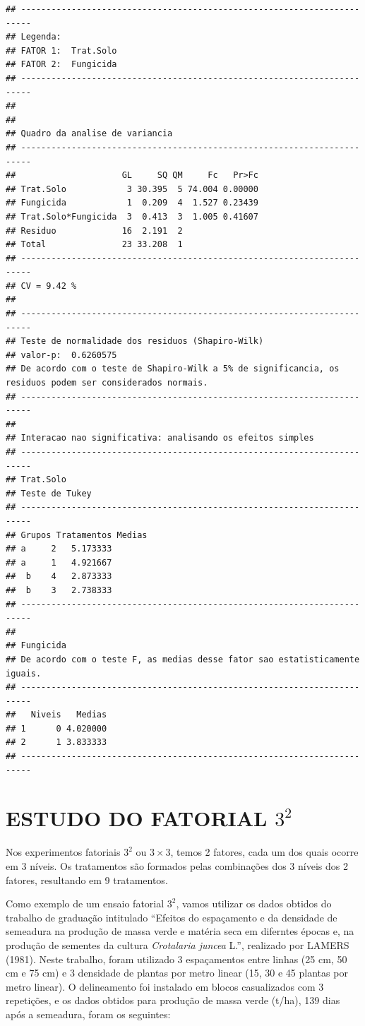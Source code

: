 \documentclass[
]{book}
\begin{document}
\begin{verbatim}
## ------------------------------------------------------------------------
## Legenda:
## FATOR 1:  Trat.Solo 
## FATOR 2:  Fungicida 
## ------------------------------------------------------------------------
## 
## 
## Quadro da analise de variancia
## ------------------------------------------------------------------------
##                     GL     SQ QM     Fc   Pr>Fc
## Trat.Solo            3 30.395  5 74.004 0.00000
## Fungicida            1  0.209  4  1.527 0.23439
## Trat.Solo*Fungicida  3  0.413  3  1.005 0.41607
## Residuo             16  2.191  2               
## Total               23 33.208  1               
## ------------------------------------------------------------------------
## CV = 9.42 %
## 
## ------------------------------------------------------------------------
## Teste de normalidade dos residuos (Shapiro-Wilk)
## valor-p:  0.6260575 
## De acordo com o teste de Shapiro-Wilk a 5% de significancia, os residuos podem ser considerados normais.
## ------------------------------------------------------------------------
## 
## Interacao nao significativa: analisando os efeitos simples
## ------------------------------------------------------------------------
## Trat.Solo
## Teste de Tukey
## ------------------------------------------------------------------------
## Grupos Tratamentos Medias
## a     2   5.173333 
## a     1   4.921667 
##  b    4   2.873333 
##  b    3   2.738333 
## ------------------------------------------------------------------------
## 
## Fungicida
## De acordo com o teste F, as medias desse fator sao estatisticamente iguais.
## ------------------------------------------------------------------------
##   Niveis   Medias
## 1      0 4.020000
## 2      1 3.833333
## ------------------------------------------------------------------------
\end{verbatim}

\hypertarget{estudo-do-fatorial-32}{%
\chapter{\texorpdfstring{ESTUDO DO FATORIAL \(3^2\)}{ESTUDO DO FATORIAL 3\^{}2}}\label{estudo-do-fatorial-32}}

Nos experimentos fatoriais \(3^2\) ou \(3 \times 3\), temos 2 fatores, cada um dos quais ocorre em 3 níveis. Os tratamentos são formados pelas combinações dos 3 níveis dos 2 fatores, resultando em 9 tratamentos.

Como exemplo de um ensaio fatorial \(3^2\), vamos utilizar os dados obtidos do trabalho de graduação intitulado ``Efeitos do espaçamento e da densidade de semeadura na produção de massa verde e matéria seca em diferntes épocas e, na produção de sementes da cultura \emph{Crotalaria juncea} L.'', realizado por LAMERS (1981). Neste trabalho, foram utilizado 3 espaçamentos entre linhas (25 cm, 50 cm e 75 cm) e 3 densidade de plantas por metro linear (15, 30 e 45 plantas por metro linear). O delineamento foi instalado em blocos casualizados com 3 repetições, e os dados obtidos para produção de massa verde (t/ha), 139 dias após a semeadura, foram os seguintes:
\end{document}
